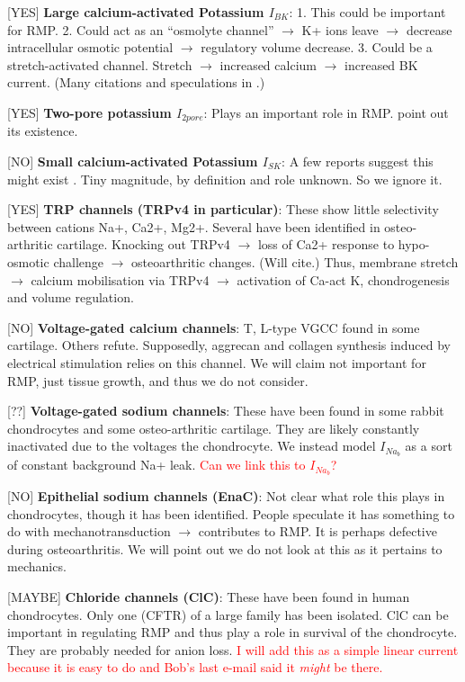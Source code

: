 [YES] {\bf Large calcium-activated Potassium $I_{BK}$}: 1. This could
be important for RMP. 2. Could act as an ``osmolyte channel''
$\rightarrow$ K+ ions leave $\rightarrow$ decrease intracellular
osmotic potential $\rightarrow$ regulatory volume decrease. 3. Could
be a stretch-activated channel. Stretch $\rightarrow$ increased
calcium $\rightarrow$ increased BK current. (Many citations and
speculations in \citet{BarrettJolleyetal2010}.)

[YES] {\bf Two-pore potassium $I_{2 pore}$}: Plays an important role
in RMP. \citep{Clarketal2011} point out its existence.

[NO] {\bf Small calcium-activated Potassium $I_{SK}$}: A few reports
suggest this might exist \citep{Halletal1996,
  BarrettJolleyetal2010}. Tiny magnitude, by definition and role
unknown. So we ignore it.

[YES] {\bf TRP channels (TRPv4 in particular)}: These show little
selectivity between cations Na+, Ca2+, Mg2+. Several have been
identified in osteo-arthritic cartilage. Knocking out TRPv4
$\rightarrow$ loss of Ca2+ response to hypo-osmotic challenge
$\rightarrow$ osteoarthritic changes. (Will cite.) Thus, membrane
stretch $\rightarrow$ calcium mobilisation via TRPv4 $\rightarrow$
activation of Ca-act K, chondrogenesis and volume regulation.

[NO] {\bf Voltage-gated calcium channels}: T, L-type VGCC found in
some cartilage. Others refute. Supposedly, aggrecan and collagen
synthesis induced by electrical stimulation relies on this channel. We
will claim not important for RMP, just tissue growth, and thus we do
not consider.

[??] {\bf Voltage-gated sodium channels}: These have been found in
some rabbit chondrocytes and some osteo-arthritic cartilage. They are
likely constantly inactivated due to the voltages the
chondrocyte.  We instead model $I_{Na_{b}}$ as a sort of constant
background Na+ leak. \textcolor{red}{Can we link this to
  $I_{Na_{b}}$?}

[NO] {\bf Epithelial sodium channels (EnaC)}: Not clear what role this
plays in chondrocytes, though it has been identified. People speculate
it has something to do with mechanotransduction $\rightarrow$
contributes to RMP. It is perhaps defective during osteoarthritis. We
will point out we do not look at this as it pertains to mechanics.

[MAYBE] {\bf Chloride channels (ClC)}: These have been found in human
chondrocytes. Only one (CFTR) of a large family has been isolated. ClC
can be important in regulating RMP and thus play a role in survival of
the chondrocyte. They are probably needed for anion loss.
\textcolor{red}{I will add this as a simple linear current because it
  is easy to do and Bob's last e-mail said it {\em might} be there.}

